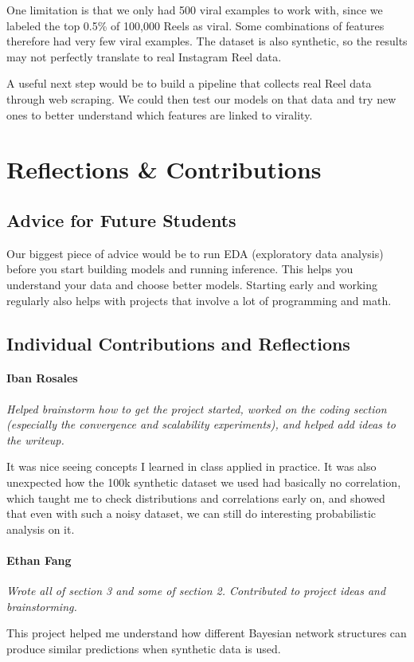 \documentclass{article}
\begin{document}
One limitation is that we only had 500 viral examples to work with, since we labeled the top
0.5\% of 100,000 Reels as viral. Some combinations of features therefore had
very few viral examples. The dataset is also synthetic, so the results may
not perfectly translate to real Instagram Reel data.

A useful next step would be to build a pipeline that collects real Reel data
through web scraping. We could then test our models on that data and try new
ones to better understand which features are linked to virality.

\section{Reflections \& Contributions}

\subsection{Advice for Future Students}
Our biggest piece of advice would be to run EDA (exploratory data analysis)
before you start building models and running inference. This helps you
understand your data and choose better models. Starting early and working
regularly also helps with projects that involve a lot of programming and math.

\subsection{Individual Contributions and Reflections}
\paragraph{Iban Rosales}
\textit{Helped brainstorm how to get the project started, worked on the coding section (especially the convergence and scalability experiments), and helped add ideas to the writeup.}\par
It was nice seeing concepts I learned in class applied in practice. It was also unexpected how the 100k synthetic dataset we used had basically no correlation, which taught me to check distributions and correlations early on, and showed that even with such a noisy dataset, we can still do interesting probabilistic analysis on it.

\paragraph{Ethan Fang}
\textit{Wrote all of section 3 and some of section 2. Contributed to project ideas and brainstorming.}\par
This project helped me understand how different Bayesian network structures can produce similar predictions when synthetic data is used.
\end{document}
